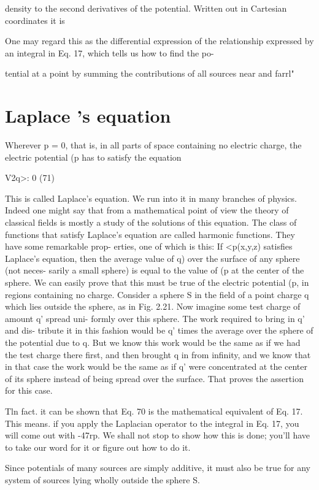density to the second derivatives of the potential. Written out in
Cartesian coordinates it is

One may regard this as the differential expression of the relationship
expressed by an integral in Eq. 17, which tells us how to find the po-

tential at a point by summing the contributions of all sources near
and farrl"

\section{Laplace 's equation}

Wherever p = 0, that is, in all parts of space containing no electric
charge, the electric potential (p has to satisfy the equation

V2q>: 0 (71)

This is called Laplace's equation. We run into it in many branches
of physics. Indeed one might say that from a mathematical point of
view the theory of classical fields is mostly a study of the solutions of
this equation. The class of functions that satisfy Laplace's equation
are called harmonic functions. They have some remarkable prop-
erties, one of which is this: If <p(x,y,z) satisfies Laplace's equation,
then the average value of q) over the surface of any sphere (not neces-
sarily a small sphere) is equal to the value of (p at the center of the
sphere. We can easily prove that this must be true of the electric
potential (p, in regions containing no charge. Consider a sphere S
in the field of a point charge q which lies outside the sphere, as in
Fig. 2.21. Now imagine some test charge of amount q' spread uni-
formly over this sphere. The work required to bring in q' and dis-
tribute it in this fashion would be q' times the average over the sphere
of the potential due to q. But we know this work would be the same
as if we had the test charge there first, and then brought q in from
infinity, and we know that in that case the work would be the same as
if q' were concentrated at the center of its sphere instead of being
spread over the surface. That proves the assertion for this case.

Tln fact. it can be shown that Eq. 70 is the mathematical equivalent of Eq. 17. This
means. if you apply the Laplacian operator to the integral in Eq. 17, you will come
out with -47rp. We shall not stop to show how this is done; you'll have to take our
word for it or figure out how to do it.

Since potentials of many sources are simply additive, it must also be
true for any system of sources lying wholly outside the sphere S.

